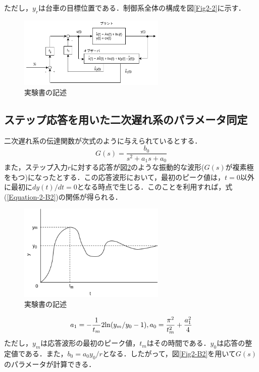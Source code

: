 \documentclass[12pt]{jsarticle}
\begin{document}
ただし，$y_r$は台車の目標位置である．制御系全体の構成を図\ref{Fig2-2}に示す．
\begin{figure}[tb]
  \begin{center}
    \includegraphics[clip,width=7.0cm]{../img/B2-2.png}
    \caption{実験書の記述}%
    \label{B2-2}
  \end{center}
\end{figure}
\subsection{ステップ応答を用いた二次遅れ系のパラメータ同定}
二次遅れ系の伝達関数が次式のように与えられているとする．
\begin{equation}
  \label{Equation-2-B1}
  G(s) = \frac{b_0}{s^2+a_1s+a_0}
\end{equation}
また，ステップ入力$r$に対する応答が図\ref{Fig2-B1}のような振動的な波形($G(s)$が複素極をもつ)になったとする．この応答波形において，最初のピーク値は，$t=0$以外に最初に$dy(t)/dt = 0$となる時点で生じる．このことを利用すれば，式(\ref{Equation-2-B2})の関係が得られる．
\begin{figure}[tb]
  \begin{center}
    \includegraphics[clip,width=7.0cm]{../img/2-B1.png}
    \caption{実験書の記述}%
    \label{Fig2-B1}
  \end{center}
\end{figure}
\begin{equation}
  \label{Equation-2-B2}
  a_1 = -\frac{1}{t_m}2{\rm ln}(y_m/y_0 -1),  a_0 = \frac{\pi^2}{t_m^2}+\frac{a_1^2}{4}
\end{equation}
ただし，$y_m$は応答波形の最初のピーク値，$t_m$はその時間である．$y_0$は応答の整定値である．また，$b_0=a_0y_0/r$となる．したがって，図\ref{Fig2-B2}を用いて$G(s)$のパラメータが計算できる．
\end{document}
